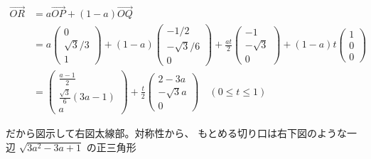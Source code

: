 \documentclass[../main.tex]{subfiles}
\begin{document}
\begin{align*}
  \overrightarrow{OR} &= a \overrightarrow{OP} + (1-a) \overrightarrow{OQ} \\
  &= a
  \begin{pmatrix} 0 \\ \sqrt{3}/3 \\ 1
  \end{pmatrix} + (1-a)
  \begin{pmatrix} -1/2 \\ -\sqrt{3}/6 \\ 0
  \end{pmatrix} + \frac{at}{2}
  \begin{pmatrix} -1 \\ -\sqrt{3} \\ 0
  \end{pmatrix} + (1-a)t
  \begin{pmatrix} 1 \\ 0 \\ 0
  \end{pmatrix} \\
  &=
  \begin{pmatrix} \frac{a-1}{2} \\ \frac{\sqrt{3}}{6}(3a-1) \\ a
  \end{pmatrix} + \frac{t}{2}
  \begin{pmatrix} 2-3a \\ -\sqrt{3}a \\ 0
  \end{pmatrix} \quad (0 \le t \le 1)
\end{align*}

だから図示して右図太線部。対称性から、
もとめる切り口は右下図のような一辺 $\sqrt{3a^2-3a+1}$ の正三角形
\end{document}
